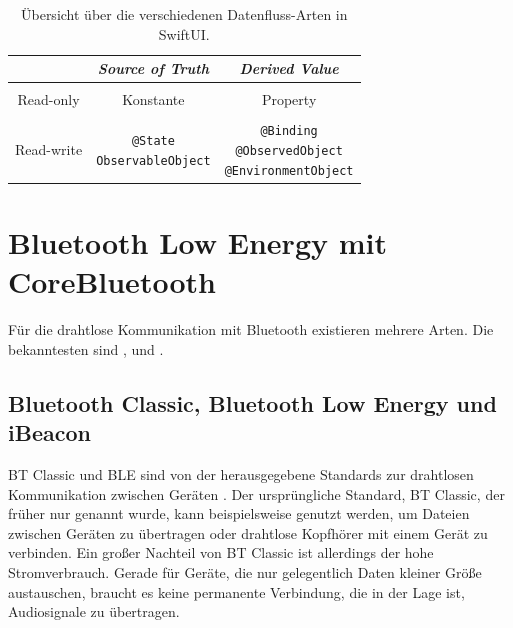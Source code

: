 \begin{table}[H]
\centering
\begin{tabular}{c|cc}
& \emph{Source of Truth} & \emph{Derived Value}\\
\hline&&\\
Read-only & Konstante & Property\\&&\\
Read-write & \makecell{\texttt{@State}\\\texttt{ObservableObject}} & \makecell{\texttt{@Binding}\\\texttt{@ObservedObject}\\\texttt{@EnvironmentObject}}\\
\end{tabular}
\caption{\label{tab:data-flow}Übersicht über die verschiedenen Datenfluss-Arten in SwiftUI.}
\end{table}

\section{Bluetooth Low Energy mit CoreBluetooth}\label{sec:bluetooth}

Für die drahtlose Kommunikation mit  Bluetooth existieren mehrere Arten. Die bekanntesten sind ,  und .

\subsection{Bluetooth Classic, Bluetooth Low Energy und iBeacon}

\acl{BT Classic} und \acl{BLE} sind von der  herausgegebene Standards zur drahtlosen Kommunikation zwischen Geräten \cite{Group:2019:Bluetooth-Core-Specification}. Der ursprüngliche Standard, \ac{BT Classic}, der früher nur  genannt wurde, kann beispielsweise genutzt werden, um Dateien zwischen Geräten zu übertragen oder drahtlose Kopfhörer mit einem Gerät zu verbinden. Ein großer Nachteil von \ac{BT Classic} ist allerdings der hohe Stromverbrauch. Gerade für Geräte, die nur gelegentlich Daten kleiner Größe austauschen, braucht es keine permanente Verbindung, die in der Lage ist, Audiosignale zu übertragen. 

